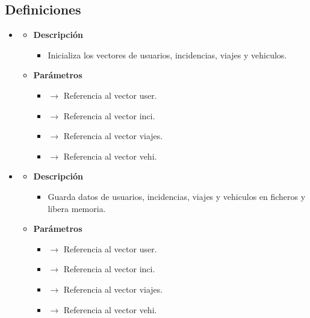 \subsection{Definiciones}
\begin{itemize}
     \item {}
    \begin{itemize}
        \item \textbf{Descripción}
        \begin{itemize}
			\item Inicializa los vectores de usuarios, incidencias, viajes y vehiculos.
		\end{itemize}
		\item \textbf{Parámetros}
		\begin{itemize}
			\item {} $\rightarrow$ Referencia al vector user.
			\item {} $\rightarrow$ Referencia al vector inci.
			\item {} $\rightarrow$ Referencia al vector viajes.
			\item {} $\rightarrow$ Referencia al vector vehi.
		\end{itemize}
	\end{itemize}
    \item {}
    \begin{itemize}
        \item \textbf{Descripción}
        \begin{itemize}
			\item Guarda datos de usuarios, incidencias, viajes y vehiculos en ficheros y libera memoria.
		\end{itemize}
		\item \textbf{Parámetros}
		\begin{itemize}
			\item {} $\rightarrow$ Referencia al vector user.
			\item {} $\rightarrow$ Referencia al vector inci.
			\item {} $\rightarrow$ Referencia al vector viajes.
			\item {} $\rightarrow$ Referencia al vector vehi.
		\end{itemize}
	\end{itemize}
\end{itemize}
\newpage
